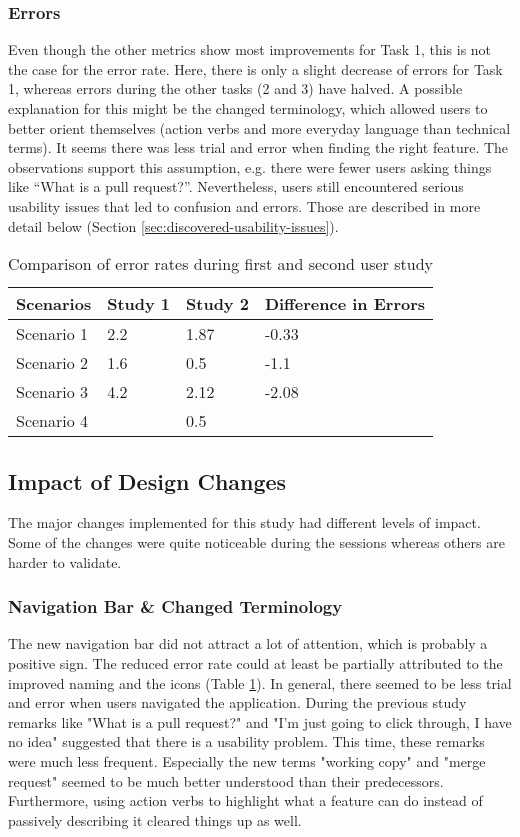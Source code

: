 \subsubsection{Errors}
Even though the other metrics show most improvements for Task 1, this is not the case for the error rate. Here, there is only a slight decrease of errors for Task 1, whereas errors during the other tasks (2 and 3) have halved. A possible explanation for this might be the changed terminology, which allowed users to better orient themselves (action verbs and more everyday language than technical terms). It seems there was less trial and error when finding the right feature. The observations support this assumption, e.g. there were fewer users asking things like “What is a pull request?”. Nevertheless, users still encountered serious usability issues that led to confusion and errors. Those are described in more detail below (Section \ref{sec:discovered-usability-issues}).

\begin{table}[h!]
\centering
\begin{tabular}{|l|l|l|l|}
\hline
\rowcolor[HTML]{EFEFEF}
{\bf Scenarios} & {\bf Study 1} & {\bf Study 2} & {\bf Difference in Errors} \\ \hline
Scenario 1 & 2.2 & 1.87 & -0.33 \\ \hline
Scenario 2 & 1.6 & 0.5 & -1.1 \\ \hline
Scenario 3 & 4.2 & 2.12 & -2.08 \\ \hline
Scenario 4 &  & 0.5 &  \\ \hline
\end{tabular}
\caption{Comparison of error rates during first and second user study }
\label{table:second-study-error-rate}
\end{table}

\subsection{Impact of Design Changes}
The major changes implemented for this study had different levels of impact. Some of the changes were quite noticeable during the sessions whereas others are harder to validate.

\subsubsection{Navigation Bar \& Changed Terminology}
The new navigation bar did not attract a lot of attention, which is probably a positive sign. The reduced error rate could at least be partially attributed to the improved naming and the icons (Table \ref{table:second-study-error-rate}). In general, there seemed to be less trial and error when users navigated the application. During the previous study remarks like "What is a pull request?" and "I'm just going to click through, I have no idea" suggested that there is a usability problem. This time, these remarks were much less frequent. Especially the new terms "working copy" and "merge request" seemed to be much better understood than their predecessors. Furthermore, using action verbs to highlight what a feature can do instead of passively describing it cleared things up as well.

